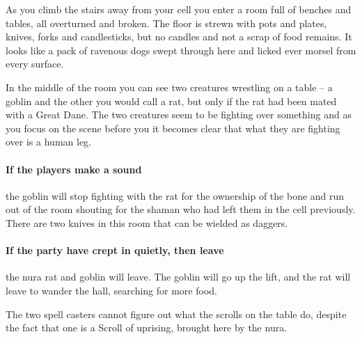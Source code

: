 \begin{multicols}{2}

\begin{boxtext}

	As you climb the stairs away from your cell you enter a room full of benches and tables, all overturned and broken. 
	The floor is strewn with pots and plates, knives, forks and candlesticks, but no candles and not a scrap of food remains.
	It looks like a pack of ravenous dogs swept through here and licked ever morsel from every surface.

	In the middle of the room you can see two creatures wrestling on a table -- a goblin and the other you would call a rat, but only if the rat had been mated with a Great Dane.
	The two creatures seem to be fighting over something and as you focus on the scene before you it becomes clear that what they are fighting over is a human leg.

\end{boxtext}

\paragraph{If the players make a sound}
the goblin will stop fighting with the rat for the ownership of the bone and run out of the room shouting for the shaman who had left them in the cell previously.
There are two knives in this room that can be wielded as daggers.

\paragraph{If the party have crept in quietly, then leave}
the nura rat and goblin will leave.
The goblin will go up the lift, and the rat will leave to wander the hall, searching for more food.





The two spell casters cannot figure out what the scrolls on the table do, despite the fact that one is a Scroll of uprising, brought here by the nura.


\end{multicols}
